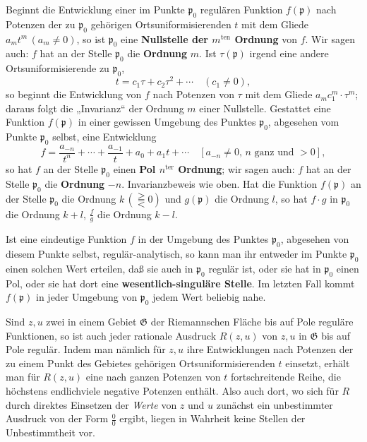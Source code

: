 \documentclass{article}
\begin{document}
Beginnt die Entwicklung einer im Punkte $\mathfrak{p}_0$ regulären Funktion $f(\mathfrak{p})$ nach Potenzen der zu $\mathfrak{p}_0$ gehörigen Ortsuniformisierenden $t$ mit dem Gliede $a_m t^m\,(a_m \neq 0)$, so ist $\mathfrak{p}_0$ eine \textbf{Nullstelle der $m^{\text{ten}}$ Ordnung} von $f$. Wir sagen auch: $f$ hat an der Stelle $\mathfrak{p}_0$ die \textbf{Ordnung} $m$. Ist $\tau(\mathfrak{p})$ irgend eine andere Ortsuniformisierende zu $\mathfrak{p}_0$,
\[ t = c_1 \tau + c_2 \tau^2 + \cdots \quad (c_1 \neq 0), \]
so beginnt die Entwicklung von $f$ nach Potenzen von $\tau$ mit dem Gliede $a_m c_1^m \cdot \tau^m$; daraus folgt die „Invarianz“ der Ordnung $m$ einer Nullstelle. Gestattet eine Funktion $f(\mathfrak{p})$ in einer gewissen Umgebung des Punktes $\mathfrak{p}_0$, abgesehen vom Punkte $\mathfrak{p}_0$ selbst, eine Entwicklung
\[ f = \frac{a_{-n}}{t^n} + \cdots + \frac{a_{-1}}{t} + a_0 + a_1 t + \cdots \quad [a_{-n} \neq 0,\, n \text{ ganz und } > 0], \]
so hat $f$ an der Stelle $\mathfrak{p}_0$ einen \textbf{Pol $n^{\text{ter}}$ Ordnung}; wir sagen auch: $f$ hat an der Stelle $\mathfrak{p}_0$ die \textbf{Ordnung} $-n$. Invarianzbeweis wie oben. Hat die Funktion $f(\mathfrak{p})$ an der Stelle $\mathfrak{p}_0$ die Ordnung $k\,(\gtreqqless 0)$ und $g(\mathfrak{p})$ die Ordnung $l$, so hat $f \cdot g$ in $\mathfrak{p}_0$ die Ordnung $k + l$, $\frac{f}{g}$ die Ordnung $k - l$.

Ist eine eindeutige Funktion $f$ in der Umgebung des Punktes $\mathfrak{p}_0$, abgesehen von diesem Punkte selbst, regulär-analytisch, so kann man ihr entweder im Punkte $\mathfrak{p}_0$ einen solchen Wert erteilen, daß sie auch in $\mathfrak{p}_0$ regulär ist, oder sie hat in $\mathfrak{p}_0$ einen Pol, oder sie hat dort eine \textbf{wesentlich-singuläre Stelle}. Im letzten Fall kommt $f(\mathfrak{p})$ in jeder Umgebung von $\mathfrak{p}_0$ jedem Wert beliebig nahe.

Sind $z, u$ zwei in einem Gebiet $\mathfrak{G}$ der Riemannschen Fläche bis auf Pole reguläre Funktionen, so ist auch jeder rationale Ausdruck $R(z, u)$ von $z, u$ in $\mathfrak{G}$ bis auf Pole regulär. Indem man nämlich für $z, u$ ihre Entwicklungen nach Potenzen der zu einem Punkt des Gebietes gehörigen Ortsuniformisierenden $t$ einsetzt, erhält man für $R(z, u)$ eine nach ganzen Potenzen von $t$ fortschreitende Reihe, die höchstens endlichviele negative Potenzen enthält. Also auch dort, wo sich für $R$ durch direktes Einsetzen der \emph{Werte} von $z$ und $u$ zunächst ein unbestimmter Ausdruck von der Form $\frac{0}{0}$ ergibt, liegen in Wahrheit keine Stellen der Unbestimmtheit vor.
\end{document}
